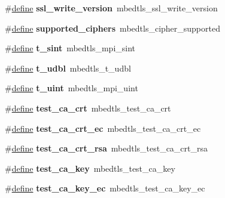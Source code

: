 \begin{DoxyCompactItemize}
\#\hyperlink{structdefine}{define} {\bfseries ssl\+\_\+write\+\_\+version}~mbedtls\+\_\+ssl\+\_\+write\+\_\+version
\item 
\mbox{\label{compat-1_83_8h_a13c61599256630b64d6930611782e299}} 
\#\hyperlink{structdefine}{define} {\bfseries supported\+\_\+ciphers}~mbedtls\+\_\+cipher\+\_\+supported
\item 
\mbox{\label{compat-1_83_8h_ab907e059e683d5f0bad2af7fab6508f0}} 
\#\hyperlink{structdefine}{define} {\bfseries t\+\_\+sint}~mbedtls\+\_\+mpi\+\_\+sint
\item 
\mbox{\label{compat-1_83_8h_a6984ea062ca0673c6c96f83576f6c30f}} 
\#\hyperlink{structdefine}{define} {\bfseries t\+\_\+udbl}~mbedtls\+\_\+t\+\_\+udbl
\item 
\mbox{\label{compat-1_83_8h_a1eb390768417258ca1b8b9d2d69de7ea}} 
\#\hyperlink{structdefine}{define} {\bfseries t\+\_\+uint}~mbedtls\+\_\+mpi\+\_\+uint
\item 
\mbox{\label{compat-1_83_8h_a526bdbdc7e473f1bd0b5558817f3af60}} 
\#\hyperlink{structdefine}{define} {\bfseries test\+\_\+ca\+\_\+crt}~mbedtls\+\_\+test\+\_\+ca\+\_\+crt
\item 
\mbox{\label{compat-1_83_8h_ae68bb0394e7eccba3190a77f6da98b0a}} 
\#\hyperlink{structdefine}{define} {\bfseries test\+\_\+ca\+\_\+crt\+\_\+ec}~mbedtls\+\_\+test\+\_\+ca\+\_\+crt\+\_\+ec
\item 
\mbox{\label{compat-1_83_8h_ae557fa875b1a656ac081d7a7dd8fa1cf}} 
\#\hyperlink{structdefine}{define} {\bfseries test\+\_\+ca\+\_\+crt\+\_\+rsa}~mbedtls\+\_\+test\+\_\+ca\+\_\+crt\+\_\+rsa
\item 
\mbox{\label{compat-1_83_8h_aca9722e2066b367a60fe9efa93a0abae}} 
\#\hyperlink{structdefine}{define} {\bfseries test\+\_\+ca\+\_\+key}~mbedtls\+\_\+test\+\_\+ca\+\_\+key
\item 
\mbox{\label{compat-1_83_8h_a02455aad5ddd464087a43deffc16b0a4}} 
\#\hyperlink{structdefine}{define} {\bfseries test\+\_\+ca\+\_\+key\+\_\+ec}~mbedtls\+\_\+test\+\_\+ca\+\_\+key\+\_\+ec

\end{DoxyCompactItemize}

